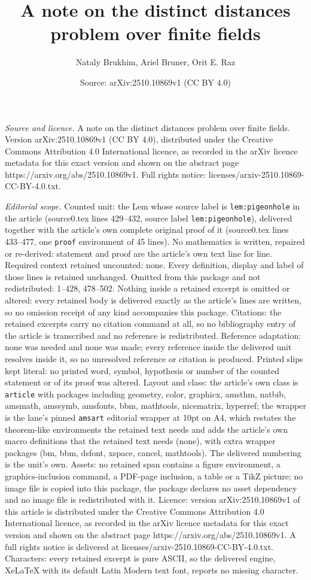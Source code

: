 \documentclass[10pt,a4paper]{amsart}
\title[A note on the distinct distances problem over finite fields]{A note on the distinct distances problem over finite fields}
\author{Nataly Brukhim, Ariel Bruner, Orit E. Raz}
\date{Source: arXiv:2510.10869v1 (CC BY 4.0)}
\begin{document}
\maketitle

\noindent\emph{Source and licence.} A note on the distinct distances problem over finite fields. Version arXiv:2510.10869v1 (CC BY 4.0), distributed under the Creative Commons Attribution 4.0 International licence, as recorded in the arXiv licence metadata for this exact version and shown on the abstract page https://arxiv.org/abs/2510.10869v1. Full rights notice: licenses/arxiv-2510.10869-CC-BY-4.0.txt.\par\smallskip

\noindent\textit{Editorial scope.} Counted unit: the Lem whose source label is \texttt{lem:pigeonhole} in the article (source0.tex lines 429--432, source label \texttt{lem:pigeonhole}), delivered together with the article's own complete original proof of it (source0.tex lines 433--477, one \texttt{proof} environment of 45 lines). No mathematics is written, repaired or re-derived: statement and proof are the article's own text line for line. Required context retained uncounted: none. Every definition, display and label of those lines is retained unchanged. Omitted from this package and not redistributed: 1--428, 478--502. Nothing inside a retained excerpt is omitted or altered: every retained body is delivered exactly as the article's lines are written, so no omission receipt of any kind accompanies this package. Citations: the retained excerpts carry no citation command at all, so no bibliography entry of the article is transcribed and no reference is redistributed. Reference adaptation: none was needed and none was made; every reference inside the delivered unit resolves inside it, so no unresolved reference or citation is produced. Printed slips kept literal: no printed word, symbol, hypothesis or number of the counted statement or of its proof was altered. Layout and class: the article's own class is \texttt{article} with packages including geometry, color, graphicx, amsthm, natbib, amsmath, amssymb, amsfonts, bbm, mathtools, nicematrix, hyperref; the wrapper is the lane's pinned \texttt{amsart} editorial wrapper at 10pt on A4, which restates the theorem-like environments the retained text needs and adds the article's own macro definitions that the retained text needs (none), with extra wrapper packages (bm, bbm, dsfont, xspace, cancel, mathtools). The delivered numbering is the unit's own. Assets: no retained span contains a figure environment, a graphics-inclusion command, a PDF-page inclusion, a table or a TikZ picture; no image file is copied into this package, the package declares no asset dependency and no image file is redistributed with it. Licence: version arXiv:2510.10869v1 of this article is distributed under the Creative Commons Attribution 4.0 International licence, as recorded in the arXiv licence metadata for this exact version and shown on the abstract page https://arxiv.org/abs/2510.10869v1. A full rights notice is delivered at licenses/arxiv-2510.10869-CC-BY-4.0.txt. Characters: every retained excerpt is pure ASCII, so the delivered engine, XeLaTeX with its default Latin Modern text font, reports no missing character.
\end{document}
